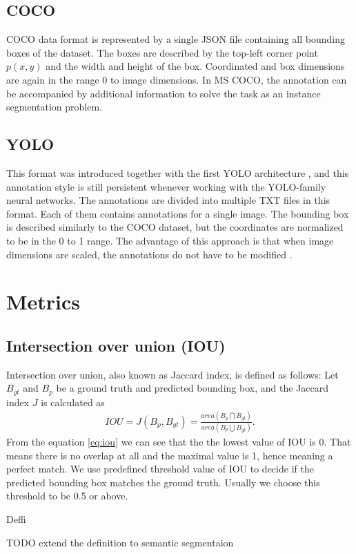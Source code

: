 \subsection{COCO}
COCO data format is represented by a single JSON file containing all bounding boxes of the dataset. The boxes are described by the top-left corner point $p(x,y)$ and the width and height of the box. Coordinated and box dimensions are again in the range 0 to image dimensions. In MS COCO, the annotation can be accompanied by additional information to solve the task as an instance segmentation problem.
\subsection{YOLO}
This format was introduced together with the first YOLO architecture \cite{Redmon2015}, and this annotation style is still persistent whenever working with the YOLO-family neural networks.
The annotations are divided into multiple TXT files in this format. Each of them contains annotations for a single image.
The bounding box is described similarly to the COCO dataset, but the coordinates are normalized to be in the 0 to 1 range. The advantage of this approach is that when image dimensions are scaled, the annotations do not have to be modified \cite{Redmon2015, Padilla2021}.


\section{Metrics}
\subsection{Intersection over union (IOU) }
Intersection over union, also known as Jaccard index, is defined as follows: Let $B_{gt}$ and $B_p$ be a ground truth and predicted bounding box, and the Jaccard index $J$ is calculated as
\begin{align}
    IOU = J(B_p, B_{gt}) = \frac{area(B_p \bigcap B_{gt})}{area(B_p \bigcup B_{gt})}.
    \label{eq:iou}
\end{align}
From the equation \ref{eq:iou} we can see that the the lowest value of IOU is 0. That means there is no overlap at all and the maximal value is 1, hence meaning a perfect match.
We use predefined threshold value of IOU to decide if the predicted bounding box matches the ground truth. Usually we choose this threshold to be 0.5 or above.

Deffi

TODO extend the definition to semantic segmentaion

